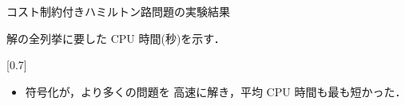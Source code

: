 \documentclass[dvipdfmx]{beamer}
\begin{document}
\begin{frame}{コスト制約付きハミルトン路問題の実験結果}

\begin{block}{}\centering
  解の全列挙に要した CPU 時間(秒)を示す．
\end{block}

\begin{center}
  \scalebox{0.7}[0.7]{
    
  }
\end{center}


\begin{itemize}
\item {} 符号化が，より多くの問題を
  高速に解き，平均 CPU 時間も最も短かった．
\end{itemize}  
\end{frame}
\end{document}
